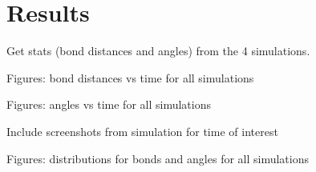 \section{Results} %
\label{sec:results}

Get stats (bond distances and angles) from the 4 simulations.

Figures: bond distances vs time for all simulations

Figures: angles vs time for all simulations

Include screenshots from simulation for time of interest

Figures: distributions for bonds and angles for all simulations

